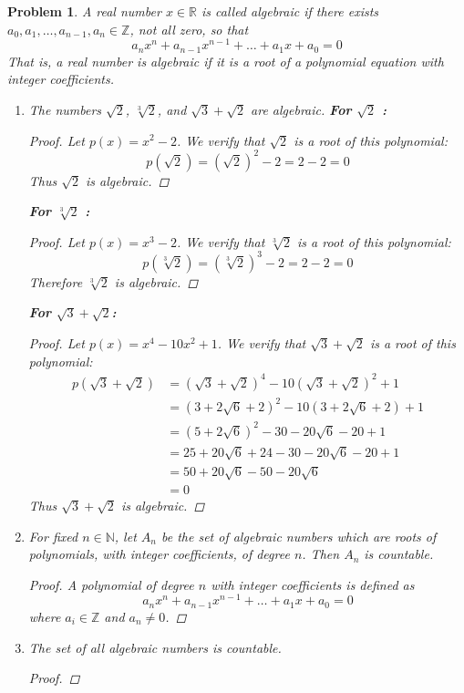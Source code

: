 \documentclass[12pt]{article}
\newtheorem{problem}{Problem}
\newcommand{\NN}{\ensuremath{\mathbb N}}
\newcommand{\RR}{\ensuremath{\mathbb R}}
\newcommand{\ZZ}{\ensuremath{\mathbb Z}}
\begin{document}
\renewcommand{\labelenumi}{(\alph{enumi})}

\begin{problem} %
A real number $x\in\RR$ is called \emph{algebraic} if there exists $a_0, a_1, \dots, a_{n-1}, a_n \in \ZZ$, not all zero, so that
	$$a_n x^n + a_{n-1} x^{n-1} + \dots + a_1 x + a_0 = 0$$
That is, a real number is algebraic if it is a root of a polynomial equation with integer coefficients.

\begin{enumerate}
\item The numbers $\sqrt{2}$, $\sqrt[3]{2}$, and $\sqrt{3} + \sqrt{2}$ are algebraic.
\newline \textbf{For $\sqrt{2}$ :} 
\begin{proof}
Let $p(x) = x^2 - 2$. We verify that $\sqrt{2}$ is a root of this polynomial:
	$$p(\sqrt{2}) = (\sqrt{2})^2 - 2 = 2 - 2  = 0$$
	Thus $\sqrt{2}$ is algebraic.
\end{proof}
\textbf{For $\sqrt[3]{2}$ :}
\begin{proof}
	Let $p(x) = x^3 - 2$. We verify that $\sqrt[3]{2}$ is a root of this polynomial:
	$$p(\sqrt[3]{2}) = (\sqrt[3]{2})^3 - 2 = 2 - 2 = 0$$
	Therefore $\sqrt[3]{2}$ is algebraic.
\end{proof}
\textbf{For $\sqrt{3} + \sqrt{2}$:}
\begin{proof}
	Let $p(x) = x^4 - 10x^2 + 1$. We verify that $\sqrt{3} + \sqrt{2}$ is a root of this polynomial:
	\begin{align*}
		p(\sqrt{3} + \sqrt{2}) &= (\sqrt{3}+\sqrt{2})^4 - 10(\sqrt{3} + \sqrt{2})^2 + 1 \\
													 &= (3 + 2\sqrt{6} + 2)^2 - 10(3 + 2\sqrt{6} + 2) + 1 \\
													 &= (5 + 2\sqrt{6})^2 - 30 - 20\sqrt{6} - 20 + 1 \\
													 &= 25 + 20\sqrt{6} + 24 - 30 - 20\sqrt{6} - 20 + 1 \\
													 &= 50 + 20\sqrt{6} - 50 - 20\sqrt{6} \\
													 &= 0
	\end{align*}
	Thus $\sqrt{3} + \sqrt{2}$ is algebraic.
\end{proof}

\item For fixed $n\in\NN$, let $A_n$ be the set of algebraic numbers which are roots of polynomials, with integer coefficients, of degree $n$.  Then $A_n$ is countable.

\begin{proof}
A polynomial of degree $n$ with integer coefficients is defined as 
	$$a_n x^n + a_{n-1} x^{n-1} + \dots + a_1 x + a_0 = 0$$ 
	where $a_i \in \ZZ$ and $a_n \neq 0$.
\end{proof}

\item The set of all algebraic numbers is countable.

\begin{proof}
\end{proof}
\end{enumerate}
\end{problem}
\end{document}
